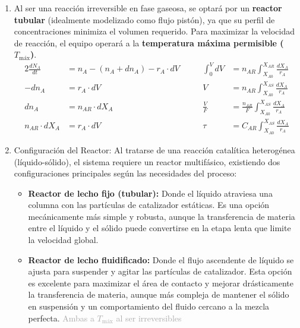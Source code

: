 \tikzset{>=stealth}
\solve{}
\begin{enumerate}[label=\Roman*.]
	\item Al ser una reacción irreversible en fase gaseosa, se optará por un \textbf{reactor tubular} (idealmente modelizado como flujo pistón), ya que su perfil de concentraciones minimiza el volumen requerido. Para maximizar la velocidad de reacción, el equipo operará a la \textbf{temperatura máxima permisible ($T_{\text{máx}}$)}.
	      \begin{alignat}{2}
		      \frac{dN_A}{dt}   & = n_A - (n_A + dn_A) - r_A \cdot dV & \qquad \int_0^V dV & = n_{AR} \int_{X_{A0}}^{X_{AR}} \frac{dX_A}{r_A} \nonumber                    \\[6pt]
		      -dn_A             & = r_A \cdot dV                      & \qquad V           & = n_{AR} \int_{X_{A0}}^{X_{AS}} \frac{dX_A}{r_A} \nonumber                    \\[6pt]
		      dn_A              & = n_{AR} \cdot dX_A                 & \qquad \frac{V}{F} & = \frac{n_{AR}}{F} \int_{X_{A0}}^{X_{AS}} \frac{dX_A}{r_A} \nonumber          \\[6pt]
		      n_{AR} \cdot dX_A & = r_A \cdot dV                      & \qquad \tau        & = C_{AR} \int_{X_{A0}}^{X_{AS}} \frac{dX_A}{r_A} \label{eq:RCFP_examen_unk_2}
	      \end{alignat}
	\item Configuración del Reactor: Al tratarse de una reacción catalítica heterogénea (líquido-sólido), el sistema requiere un reactor multifásico, existiendo dos configuraciones principales según las necesidades del proceso:
	      \begin{itemize}
		      \item \textbf{Reactor de lecho fijo (tubular):} Donde el líquido atraviesa una columna con las partículas de catalizador estáticas. Es una opción mecánicamente más simple y robusta, aunque la transferencia de materia entre el líquido y el sólido puede convertirse en la etapa lenta que limite la velocidad global.
		      \item \textbf{Reactor de lecho fluidificado:} Donde el flujo ascendente de líquido se ajusta para suspender y agitar las partículas de catalizador. Esta opción es excelente para maximizar el área de contacto y mejorar drásticamente la transferencia de materia, aunque más compleja de mantener el sólido en suspensión y un comportamiento del fluido cercano a la mezcla perfecta. {\scriptsize\textcolor{darkgray}{Ambas a $T_{\text{máx}}$ al ser irreversibles}}

\end{itemize}
\end{enumerate}
